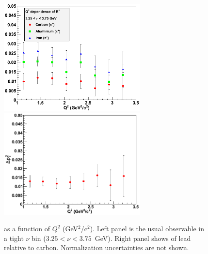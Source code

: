 \begin{figure}[tbp]
\centering
\includegraphics[width=7.4cm] {chap6-fig/F_PvQ2inNu.png} 
\includegraphics[width=7.4cm] {chap6-fig/F_PvQ2_PbC.png} 
\caption {\dpt as a function of $Q^2$ (GeV$^2$/c$^2$). Left panel is the usual
observable in a tight $\nu$ bin ($3.25 < \nu < 3.75$~GeV). Right panel shows \dpt 
of lead relative to carbon. Normalization uncertainties are not shown.}
\label{fig:PQ2-detailed}
\end{figure}

